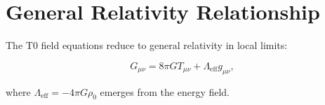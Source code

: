 \documentclass[12pt,a4paper]{report}
\theoremstyle{definition}
\begin{document}
	\section{General Relativity Relationship}
	\label{sec:gr_relationship}
	
	The T0 field equations reduce to general relativity in local limits:
	
	\begin{equation}
		G_{\mu\nu} = 8\pi G T_{\mu\nu} + \Lambda_{\text{eff}} g_{\mu\nu},
		\label{eq:gr_relationship}
	\end{equation}
	
	where \(\Lambda_{\text{eff}} = -4\pi G \rho_0\) emerges from the energy field.
	
\end{document}
